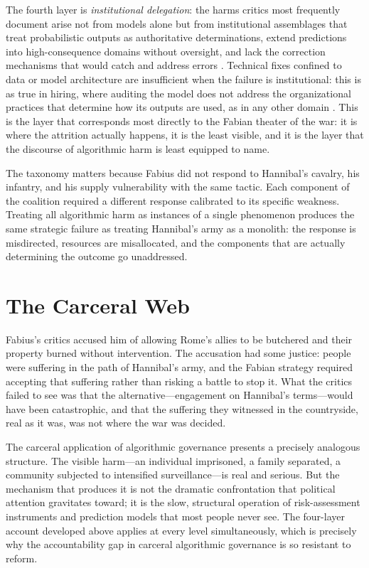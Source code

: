 \documentclass[12pt, a4paper]{article}
\begin{document}
The fourth layer is \textit{institutional delegation}: the harms critics most frequently document arise not from models alone but from institutional assemblages that treat probabilistic outputs as authoritative determinations, extend predictions into high-consequence domains without oversight, and lack the correction mechanisms that would catch and address errors \citep{busuioc2020, adalovace2021}. Technical fixes confined to data or model architecture are insufficient when the failure is institutional: this is as true in hiring, where auditing the model does not address the organizational practices that determine how its outputs are used, as in any other domain \citep{raghavan2020}. This is the layer that corresponds most directly to the Fabian theater of the war: it is where the attrition actually happens, it is the least visible, and it is the layer that the discourse of algorithmic harm is least equipped to name.

The taxonomy matters because Fabius did not respond to Hannibal's cavalry, his infantry, and his supply vulnerability with the same tactic. Each component of the coalition required a different response calibrated to its specific weakness. Treating all algorithmic harm as instances of a single phenomenon produces the same strategic failure as treating Hannibal's army as a monolith: the response is misdirected, resources are misallocated, and the components that are actually determining the outcome go unaddressed.

\section{The Carceral Web}

Fabius's critics accused him of allowing Rome's allies to be butchered and their property burned without intervention. The accusation had some justice: people were suffering in the path of Hannibal's army, and the Fabian strategy required accepting that suffering rather than risking a battle to stop it. What the critics failed to see was that the alternative---engagement on Hannibal's terms---would have been catastrophic, and that the suffering they witnessed in the countryside, real as it was, was not where the war was decided.

The carceral application of algorithmic governance presents a precisely analogous structure. The visible harm---an individual imprisoned, a family separated, a community subjected to intensified surveillance---is real and serious. But the mechanism that produces it is not the dramatic confrontation that political attention gravitates toward; it is the slow, structural operation of risk-assessment instruments and prediction models that most people never see. The four-layer account developed above applies at every level simultaneously, which is precisely why the accountability gap in carceral algorithmic governance is so resistant to reform.
\end{document}
